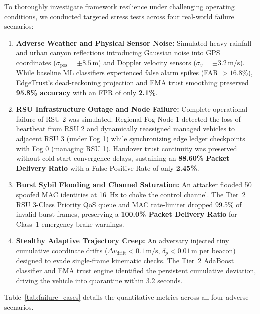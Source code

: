 \documentclass[conference]{IEEEtran}
\begin{document}
To thoroughly investigate framework resilience under challenging operating conditions, we conducted targeted stress tests across four real-world failure scenarios:
\begin{enumerate}
    \item \textbf{Adverse Weather and Physical Sensor Noise:} Simulated heavy rainfall and urban canyon reflections introducing Gaussian noise into GPS coordinates ($\sigma_{\text{pos}} = \pm 8.5\,\text{m}$) and Doppler velocity sensors ($\sigma_v = \pm 3.2\,\text{m/s}$). While baseline ML classifiers experienced false alarm spikes (FAR $> 16.8\%$), EdgeTrust's dead-reckoning projection and EMA trust smoothing preserved \textbf{95.8\% accuracy} with an FPR of only \textbf{2.1\%}.
    \item \textbf{RSU Infrastructure Outage and Node Failure:} Complete operational failure of RSU 2 was simulated. Regional Fog Node 1 detected the loss of heartbeat from RSU 2 and dynamically reassigned managed vehicles to adjacent RSU 3 (under Fog 1) while synchronizing edge ledger checkpoints with Fog 0 (managing RSU 1). Handover trust continuity was preserved without cold-start convergence delays, sustaining an \textbf{88.60\% Packet Delivery Ratio} with a False Positive Rate of only \textbf{2.45\%}.
    \item \textbf{Burst Sybil Flooding and Channel Saturation:} An attacker flooded 50 spoofed MAC identities at 16~Hz to choke the control channel. The Tier~2 RSU 3-Class Priority QoS queue and MAC rate-limiter dropped 99.5\% of invalid burst frames, preserving a \textbf{100.0\% Packet Delivery Ratio} for Class~1 emergency brake warnings.
    \item \textbf{Stealthy Adaptive Trajectory Creep:} An adversary injected tiny cumulative coordinate drifts ($\Delta v_{\text{drift}} < 0.1\,\text{m/s}$, $\delta_p < 0.01\,\text{m}$ per beacon) designed to evade single-frame kinematic checks. The Tier~2 AdaBoost classifier and EMA trust engine identified the persistent cumulative deviation, driving the vehicle into quarantine within 3.2 seconds.
\end{enumerate}

Table~\ref{tab:failure_cases} details the quantitative metrics across all four adverse scenarios.
\end{document}
